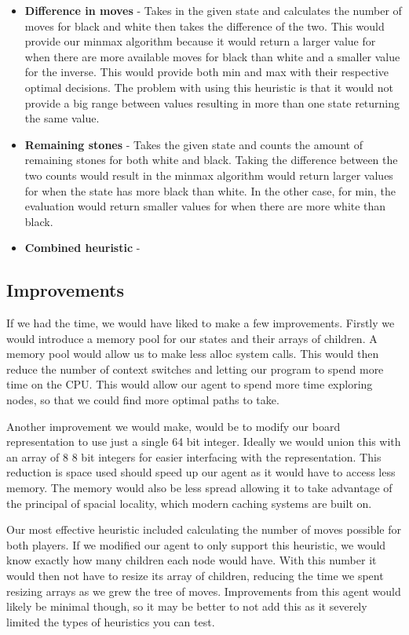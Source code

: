 \documentclass[12pt]{article}
\begin{document}
\begin{itemize}
\item \textbf{Difference in moves} -
Takes in the given state and calculates the number of moves for black and white then takes the difference of the two. 
This would provide our minmax algorithm because it would return a larger value for when there are more available moves for black than white and a smaller value for the inverse.
This would provide both min and max with their respective optimal decisions.
The problem with using this heuristic is that it would not provide a big range between values resulting in more than one state returning the same value.

\item \textbf{Remaining stones} -
Takes the given state and counts the amount of remaining stones for both white and black.
Taking the difference between the two counts would result in the minmax algorithm would return larger values for when the state has more black than white.
In the other case, for min, the evaluation would return smaller values for when there are more white than black.

\item \textbf{Combined heuristic} - 

\end{itemize}

\subsection*{Improvements}
If we had the time, we would have liked to make a few improvements.
Firstly we would introduce a memory pool for our states and their arrays of children.
A memory pool would allow us to make less alloc system calls.
This would then reduce the number of context switches and letting our program to spend more time on the CPU.
This would allow our agent to spend more time exploring nodes, so that we could find more optimal paths to take.

Another improvement we would make, would be to modify our board representation to use just a single 64 bit integer.
Ideally we would union this with an array of 8 8 bit integers for easier interfacing with the representation.
This reduction is space used should speed up our agent as it would have to access less memory.
The memory would also be less spread allowing it to take advantage of the principal of spacial locality, which modern caching systems are built on.

Our most effective heuristic included calculating the number of moves possible for both players.
If we modified our agent to only support this heuristic, we would know exactly how many children each node would have.
With this number it would then not have to resize its array of children, reducing the time we spent resizing arrays as we grew the tree of moves.
Improvements from this agent would likely be minimal though, so it may be better to not add this as it severely limited the types of heuristics you can test.
\end{document}
